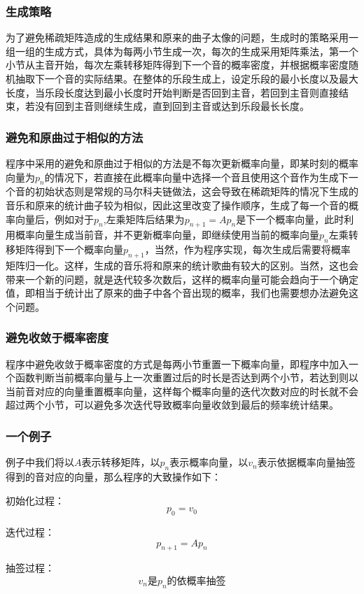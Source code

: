 \documentclass[12pt, a4paper, oneside]{ctexart}
\begin{document}
    \subsubsection{生成策略}
    为了避免稀疏矩阵造成的生成结果和原来的曲子太像的问题，生成时的策略采用一组一组的生成方式，具体为每两小节生成一次，每次的生成采用矩阵乘法，第一个小节从主音开始，每次左乘转移矩阵得到下一个音的概率密度，并根据概率密度随机抽取下一个音的实际结果。在整体的乐段生成上，设定乐段的最小长度以及最大长度，当乐段长度达到最小长度时开始判断是否回到主音，若回到主音则直接结束，若没有回到主音则继续生成，直到回到主音或达到乐段最长长度。
    \subsubsection{避免和原曲过于相似的方法}
    程序中采用的避免和原曲过于相似的方法是不每次更新概率向量，即某时刻的概率向量为$p_n$的情况下，若直接在此概率向量中选择一个音且使用这个音作为生成下一个音的初始状态则是常规的马尔科夫链做法，这会导致在稀疏矩阵的情况下生成的音乐和原来的统计曲子较为相似，因此这里改变了操作顺序，生成了每一个音的概率向量后，例如对于$p_n$,左乘矩阵后结果为$p_{n+1} = Ap_n$是下一个概率向量，此时利用概率向量生成当前音，并不更新概率向量，即继续使用当前的概率向量$p_n$左乘转移矩阵得到下一个概率向量$p_{n+1}$，当然，作为程序实现，每次生成后需要将概率矩阵归一化。这样，生成的音乐将和原来的统计歌曲有较大的区别。当然，这也会带来一个新的问题，就是迭代较多次数后，这样的概率向量可能会趋向于一个确定值，即相当于统计出了原来的曲子中各个音出现的概率，我们也需要想办法避免这个问题。
    \subsubsection{避免收敛于概率密度}
    程序中避免收敛于概率密度的方式是每两小节重置一下概率向量，即程序中加入一个函数判断当前概率向量与上一次重置过后的时长是否达到两个小节，若达到则以当前音对应的向量重置概率向量，这样每个概率向量的迭代次数对应的时长就不会超过两个小节，可以避免多次迭代导致概率向量收敛到最后的频率统计结果。
    \subsubsection{一个例子}
    例子中我们将以$A$表示转移矩阵，以$p_n$表示概率向量，以$v_n$表示依据概率向量抽签得到的音对应的向量，那么程序的大致操作如下：
    
    初始化过程：
    $$p_0 = v_0$$
    
    迭代过程：
    $$p_{n + 1} = Ap_n$$
    
    抽签过程：
    $$v_n\text{是}p_n\text{的依概率抽签}$$
    
\end{document}
